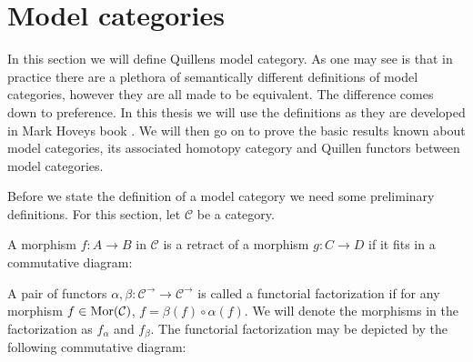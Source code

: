 \documentclass[../thesis.tex]{subfiles}
\begin{document}
    \section{Model categories}

        In this section we will define Quillens model category. As one may see is that in practice there are a plethora of semantically different definitions of model categories, however they are all made to be equivalent. The difference comes down to preference. In this thesis we will use the definitions as they are developed in Mark Hoveys book \cite{Hovey99}. We will then go on to prove the basic results known about model categories, its associated homotopy category and Quillen functors between model categories.

        Before we state the definition of a model category we need some preliminary definitions. For this section, let $\mathcal{C}$ be a category.

        \begin{definition}[Retract]
            A morphism $f:A\rightarrow B$ in $\mathcal{C}$ is a retract of a morphism $g: C\rightarrow D$ if it fits in a commutative diagram:
            \begin{center}
            \end{center}
        \end{definition}

        \begin{definition}
            A pair of functors $\alpha, \beta: \mathcal{C}^\rightarrow\rightarrow\mathcal{C}^\rightarrow$ is called a functorial factorization if for any morphism $f\in \tt{Mor}(\mathcal{C})$, $f = \beta(f)\circ\alpha(f)$. We will denote the morphisms in the factorization as $f_\alpha$ and $f_\beta$. The functorial factorization may be depicted by the following commutative diagram:
            \begin{center}
            \end{center}
        \end{definition}
\end{document}
